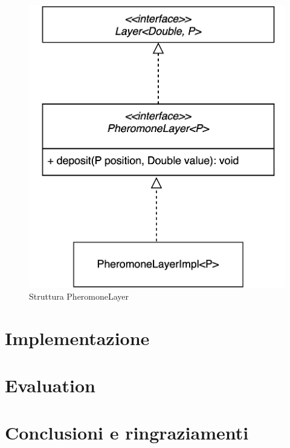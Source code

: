 \documentclass[12pt,a4paper,openright,twoside]{book}
\begin{document}
\begin{figure}[h!]
    \centering
    \includegraphics[width=.8\linewidth]{figures/pheromoneLayer.jpeg}
    \caption{Struttura PheromoneLayer}
    \label{fig:phLayer}
\end{figure}

%

\chapter{Implementazione}

\chapter{Evaluation}
\chapter{Conclusioni e ringraziamenti}

\backmatter

\nocite{*} %



\end{document}
